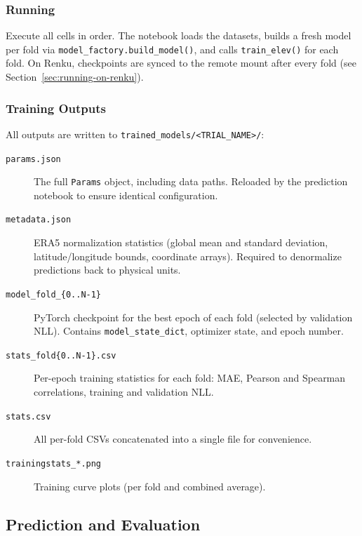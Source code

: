 \subsubsection{Running}

Execute all cells in order.
The notebook loads the datasets, builds a fresh model per fold via \texttt{model\_factory.build\_model()}, and calls \texttt{train\_elev()} for each fold.
On Renku, checkpoints are synced to the remote mount after every fold (see Section~\ref{sec:running-on-renku}).

\subsubsection{Training Outputs}

All outputs are written to \texttt{trained\_models/<TRIAL\_NAME>/}:

\begin{description}
  \item[\texttt{params.json}] The full \texttt{Params} object, including data paths. Reloaded by the prediction notebook to ensure identical configuration.

  \item[\texttt{metadata.json}] ERA5 normalization statistics (global mean and standard deviation, latitude/longitude bounds, coordinate arrays). Required to denormalize predictions back to physical units.

  \item[\texttt{model\_fold\_\{0..N-1\}}] PyTorch checkpoint for the best epoch of each fold (selected by validation NLL). Contains \texttt{model\_state\_dict}, optimizer state, and epoch number.

  \item[\texttt{stats\_fold\{0..N-1\}.csv}] Per-epoch training statistics for each fold: MAE, Pearson and Spearman correlations, training and validation NLL.

  \item[\texttt{stats.csv}] All per-fold CSVs concatenated into a single file for convenience.

  \item[\texttt{trainingstats\_*.png}] Training curve plots (per fold and combined average).
\end{description}

\subsection{Prediction and Evaluation}

